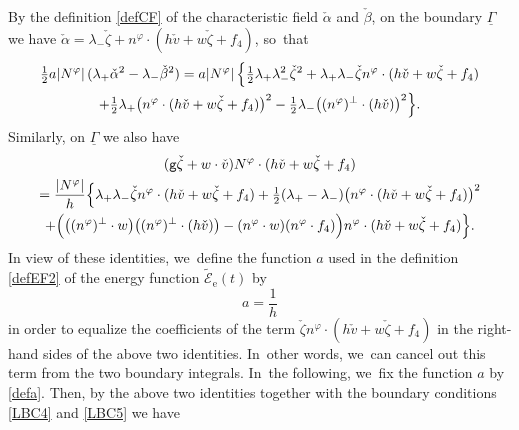 \documentclass[JEP,XML,SOM,Unicode,NoFloatCountersInSection,published]{cedram}
\newcommand{\gr}{{\mathtt g}}
\newcommand{\ul}[1]{\underline{#1}}
\newcommand{\itGamma}{\mathit{\Gamma}}
\theoremstyle{definition}
\begin{document}
By the definition \eqref{defCF} of the characteristic field $\check{\alpha}$ and $\check{\beta}$, on the boundary $\ul{\itGamma}$ we have
$\check{\alpha}=\lambda_-\check{\zeta}+n^\varphi\cdot(h\check{v}+w\check{\zeta}+f_4)$, so~that
\begin{multline*}
\tfrac12a|N^\varphi|\,(\lambda_+\check{\alpha}^2-\lambda_-\check{\beta}^2)
= a|N^\varphi|\,\Bigl\{ \tfrac12\lambda_+\lambda_-^2\check{\zeta}^2 + \lambda_+\lambda_-\check{\zeta}n^\varphi\cdot(h\check{v}+w\check{\zeta}+f_4) \\
+ \tfrac12\lambda_+ \bigl(n^\varphi\cdot(h\check{v}+w\check{\zeta}+f_4) \bigr)^2 - \tfrac12\lambda_-\bigl((n^\varphi)^\perp\cdot(h\check{v}) \bigr)^2 \Bigr\}.
\end{multline*}
Similarly, on $\ul{\itGamma}$ we also have\enlargethispage{-2\baselineskip}
\begin{multline*}
(\gr\check{\zeta}+w\cdot\check{v})N^\varphi\cdot(h\check{v}+w\check{\zeta}+f_4) \\
= \dfrac{|N^\varphi|}{h}\Bigl\{ \lambda_+\lambda_-\check{\zeta}n^\varphi\cdot(h\check{v}+w\check{\zeta}+f_4)
+ \tfrac12(\lambda_+-\lambda_-) \bigl(n^\varphi\cdot(h\check{v}+w\check{\zeta}+f_4) \bigr)^2 \\
+ \Bigl(\bigl((n^\varphi)^\perp\cdot w \bigr) \bigl((n^\varphi)^\perp\cdot(h\check{v}) \bigr)-(n^\varphi\cdot w)(n^\varphi\cdot f_4) \Bigr)
n^\varphi\cdot(h\check{v}+w\check{\zeta}+f_4) \Bigr\}.
\end{multline*}
In view of these identities, we~define the function $a$ used in the definition \eqref{defEF2} of the energy function $\widetilde{\mathscr{E}}_\mathrm{e}(t)$ by
\begin{equation}\label{defa}
a=\frac{1}{h}
\end{equation}
in order to equalize the coefficients of the term $\check{\zeta}n^\varphi\cdot(h\check{v}+w\check{\zeta}+f_4)$ in the right-hand sides of the above two identities. In~other words, we~can cancel out this term from the two boundary integrals. In~the following, we~fix the function $a$ by \eqref{defa}.
Then, by the above two identities together with the boundary conditions \eqref{LBC4} and \eqref{LBC5} we have
\end{document}
